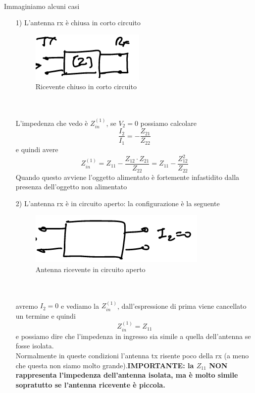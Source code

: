 \documentclass[oneside, 12pt]{extbook}
\begin{document}
\\Immaginiamo alcuni casi
\begin{itemize}
	\item[1)] L'antenna rx è chiusa in corto circuito\\
	\begin{figure}
		\includegraphics[scale=0.7]{immagini/rx_cortoc.png}
		\caption{Ricevente chiuso in corto circuito}
	\end{figure}
	\\\\L'impedenza che vedo è $Z_{in}^{(1)}$, se $V_2 = 0$ possiamo calcolare 
	\begin{equation}
		\frac{I_2}{I_1} = - \frac{Z_{21}}{Z_{22}}	
	\end{equation}
	e quindi avere  
	\begin{equation}
		Z_{in}^{(1)} = Z_{11} -\frac{Z_{12} \cdot Z_{21}}{Z_{22}} = Z_{11} -\frac{Z_{12}^2}{Z_{22}}	
	\end{equation}
	Quando questo avviene l'oggetto alimentato è fortemente infastidito dalla presenza dell'oggetto non alimentato
	\item[2)] L'antenna rx è in circuito aperto: la configurazione è la seguente\\
	\begin{figure}
		\includegraphics[scale=0.7]{immagini/ric_aperto.png}
		\caption{Antenna ricevente in circuito aperto}
	\end{figure}
	\\\\avremo $I_2 = 0$ e vediamo la $Z_{in}^{(1)}$, dall'espressione di prima viene cancellato un termine e quindi 
	\begin{equation}
		Z_{in}^{(1)} = Z_{11}	
	\end{equation}
	e possiamo dire che l'impedenza in ingresso sia simile a quella dell'antenna se fosse isolata.\\Normalmente in queste condizioni l'antenna tx risente poco della rx (a meno che questa non siamo molto grande).\textbf{IMPORTANTE: la $Z_{11}$ NON rappresenta l'impedenza dell'antenna isolata, ma è molto simile sopratutto se l'antenna ricevente è piccola.}

\end{itemize}
\end{document}
